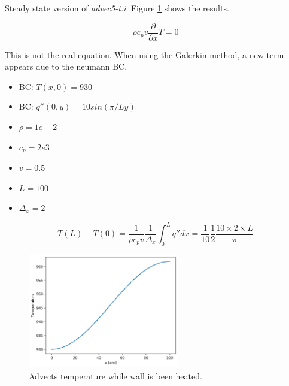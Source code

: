 \documentclass[11pt,letterpaper]{article}
\begin{document}
    Steady state version of \textit{advec5-t.i}.
    Figure \ref{fig:advec5-ss} shows the results.

	\begin{equation}
    \rho c_p v \frac{\partial}{\partial x} T = 0
	\end{equation}

	This is not the real equation. When using the Galerkin method, a new term appears due to the neumann BC.

	\begin{itemize}
		\item BC: $T(x, 0) = 930$
		\item BC: $q''(0, y) = 10 sin (\pi/L y)$
		\item $\rho = 1e-2$
		\item $c_p = 2e3$
		\item $v = 0.5$
		\item $L = 100$
		\item $\Delta_x = 2$
	\end{itemize}

	\begin{equation}
	T(L) - T(0) = \frac{1}{\rho c_p v}\frac{1}{\Delta_x}\int^L_0 q'' dx = \frac{1}{10} \frac{1}{2} \frac{10 \times 2 \times L}{\pi}
	\end{equation}

	\begin{figure}[htbp!]
		\centering
		\includegraphics[height=5cm]{advec5-ss}
		\caption{Advects temperature while wall is been heated.}
		\label{fig:advec5-ss}
	\end{figure}

\pagebreak

% 
\end{document}
